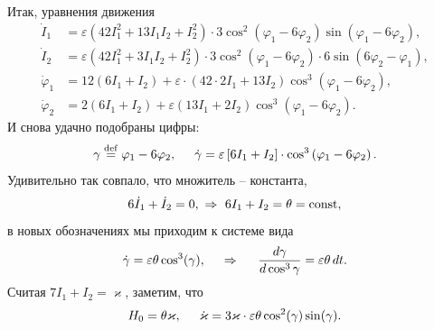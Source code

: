 Итак, уравнения движения
\begin{align*}
    \dot{I}_1 &= \varepsilon \left(
        42 I_1^2 + 13 I_1 I_2 + I_2^2
    \right) \cdot 3 \cos^2(\varphi_1-6\varphi_2) \sin(\varphi_1-6 \varphi_2), \\
    \dot{I}_2 &= \varepsilon\left(
        42 I_1^2 + 3 I_1 I_2 +I_2^2
    \right) \cdot 3 \cos^2 (\varphi_1 - 6 \varphi_2) \cdot 6 \sin(6 \varphi_2 -\varphi_1), \\
    \dot{\varphi}_1 &= 12 (6 I_1 + I_2) +  \varepsilon \cdot (42 \cdot 2 I_1 + 13 I_2) \cos^3(\varphi_1 - 6 \varphi_2), \\
    \dot{\varphi}_2 &= 2 (6 I_1 + I_2) + \varepsilon (13 I_1 +  2 I_2) \cos^3 (\varphi_1 - 6 \varphi_2).
\end{align*}
И снова удачно подобраны цифры:
\begin{equation*}
    \gamma \overset{\mathrm{def}}{=}  \varphi_1 - 6 \varphi_2 ,
    \hspace{5 mm} 
    \dot{\gamma} = \varepsilon \left[
        6 I_1 + I_2
    \right] \cdot \cos^3\left(
        \varphi_1 - 6 \varphi_2
    \right).
\end{equation*}
Удивительно так совпало, что множитель -- константа, 
\begin{equation*}
    6 \dot{I}_1 + \dot{I}_2 = 0, \ \Rightarrow \ 6 I_1 + I_2 = \theta = \const,
\end{equation*}
в новых обозначениях мы приходим к системе вида
\begin{equation*}
    \dot{\gamma} = \varepsilon \theta \cos^3(\gamma),
    \hspace{0.5cm} \Rightarrow \hspace{0.5cm}
    \frac{d \gamma}{d \cos^3 \gamma}  = \varepsilon \theta \d t.
\end{equation*}
Считая $7 I_1 + I_2 = \varkappa$, заметим, что
\begin{equation*}
    H_0 = \theta \varkappa, \hspace{5 mm} \dot{\kappa} = 3 \varkappa \cdot \varepsilon \theta \cos^2 (\gamma) \sin (\gamma).
\end{equation*}

